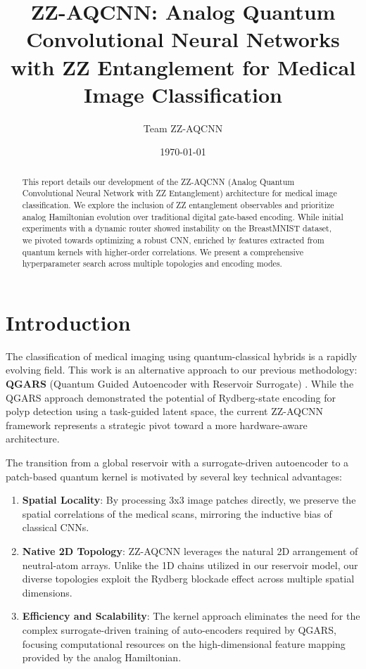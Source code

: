 \documentclass[11pt,a4paper]{article}
\title{ZZ-AQCNN: Analog Quantum Convolutional Neural Networks with ZZ Entanglement for Medical Image Classification}
\author{Team ZZ-AQCNN}
\date{\today}
\begin{document}
\maketitle

\begin{abstract}
This report details our development of the ZZ-AQCNN (Analog Quantum Convolutional Neural Network with ZZ Entanglement) architecture for medical image classification. We explore the inclusion of ZZ entanglement observables and prioritize analog Hamiltonian evolution over traditional digital gate-based encoding. While initial experiments with a dynamic router showed instability on the BreastMNIST dataset, we pivoted towards optimizing a robust CNN, enriched by features extracted from quantum kernels with higher-order correlations. We present a comprehensive hyperparameter search across multiple topologies and encoding modes.
\end{abstract}

\section{Introduction}
The classification of medical imaging using quantum-classical hybrids is a rapidly evolving field. This work is an alternative approach to our previous methodology: \textbf{QGARS} (Quantum Guided Autoencoder with Reservoir Surrogate) \cite{oqi2024}. While the QGARS approach demonstrated the potential of Rydberg-state encoding for polyp detection using a task-guided latent space, the current ZZ-AQCNN framework represents a strategic pivot toward a more hardware-aware architecture.

The transition from a global reservoir with a surrogate-driven autoencoder to a patch-based quantum kernel is motivated by several key technical advantages:
\begin{enumerate}
    \item \textbf{Spatial Locality}: By processing 3x3 image patches directly, we preserve the spatial correlations of the medical scans, mirroring the inductive bias of classical CNNs.
    \item \textbf{Native 2D Topology}: ZZ-AQCNN leverages the natural 2D arrangement of neutral-atom arrays. Unlike the 1D chains utilized in our reservoir model, our diverse topologies exploit the Rydberg blockade effect across multiple spatial dimensions.
    \item \textbf{Efficiency and Scalability}: The kernel approach eliminates the need for the complex surrogate-driven training of auto-encoders required by QGARS, focusing computational resources on the high-dimensional feature mapping provided by the analog Hamiltonian.
\end{enumerate}
\end{document}
